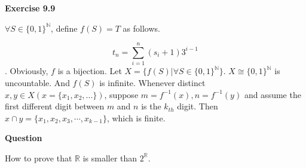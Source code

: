 \documentclass{article} %
\begin{document}
	
  \textbf{Exercise 9.9}\par
	  $\forall S\in {\{0,1\}}^{\mathbb{N}}$, define $f(S)=T$ as follows.\par
 $$t_n=\sum_{i=1}^n(s_i+1)3^{i-1}$$.
Obviously, $f$ is a bijection. Let $X=\{f(S)|\forall S\in {\{0,1\}}^{\mathbb{N}}\}$. $X\cong {\{0,1\}}^{\mathbb{N}}$ is uncountable. And $f(S)$ is infinite. Whenever distinct $x,y \in X(x=\{x_1,x_2,...\})$, suppose $m=f^{-1}(x),n=f^{-1}(y)$ and assume the first different digit between $m$ and $n$ is the $k_{th}$ digit. Then $x\cap y=\{x_1,x_2,x_3,\cdots,x_{k-1}\}$, which is finite.
	 
		\textbf{Question}\par
	 How to prove that ${\mathbb{R}}$ is smaller than $2^{\mathbb{R}}$.
	
\end{document}
